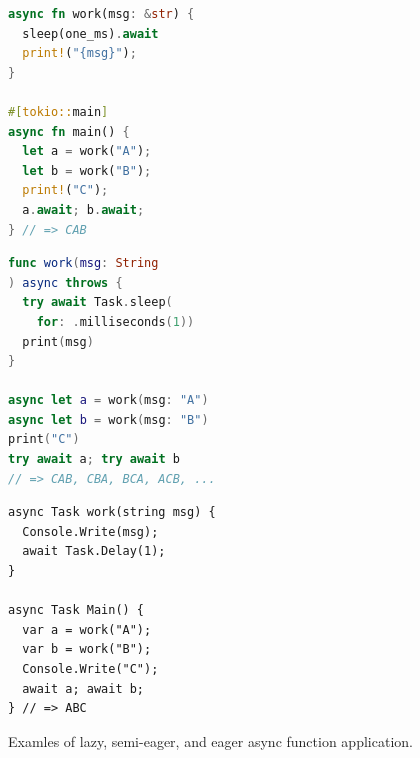 \begin{figure}[H]
  \raggedright
  \begin{minipage}[t]{0.30\textwidth}
\begin{lstlisting}[language=Rust]
async fn work(msg: &str) {
  sleep(one_ms).await
  print!("{msg}");
}

#[tokio::main]
async fn main() {
  let a = work("A");
  let b = work("B");
  print!("C");
  a.await; b.await;
} // => CAB
\end{lstlisting}
    \cprotect{}
    \label{fig:designdims:eagerness:lazy}
  \end{minipage}\hfill%
  \begin{minipage}[t]{0.33\textwidth}
\begin{lstlisting}[language=Swift]
func work(msg: String
) async throws {
  try await Task.sleep(
    for: .milliseconds(1))
  print(msg)
}

async let a = work(msg: "A")
async let b = work(msg: "B")
print("C")
try await a; try await b
// => CAB, CBA, BCA, ACB, ...
\end{lstlisting}
    \cprotect{}
    \label{fig:designdims:eagerness:semieager}
  \end{minipage}\hfill%
  \begin{minipage}[t]{0.33\textwidth}
\begin{lstlisting}[language=CSharp]
async Task work(string msg) {
  Console.Write(msg);
  await Task.Delay(1);
}

async Task Main() {
  var a = work("A");
  var b = work("B");
  Console.Write("C");
  await a; await b;
} // => ABC
\end{lstlisting}
    \cprotect{}
    \label{fig:designdims:eagerness:eager}
  \end{minipage}
  \caption{Examles of lazy, semi-eager, and eager async function application.}
  \label{fig:designdims:eagerness}
\end{figure}

